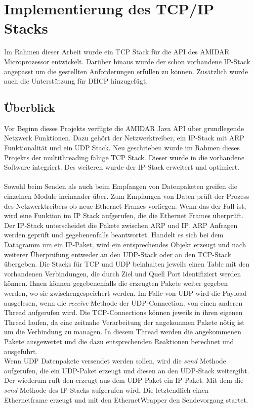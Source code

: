 \chapter{Implementierung des TCP/IP Stacks}
Im Rahmen dieser Arbeit wurde ein TCP Stack für die API des AMIDAR Microprozessor entwickelt. Darüber hinaus wurde der schon vorhandene IP-Stack angepasst um die gestellten Anforderungen erfüllen zu können. Zusätzlich wurde auch die Unterstützung für DHCP hinzugefügt.

\section{Überblick}
Vor Beginn dieses Projekts verfügte die AMIDAR Java API über grundlegende Netzwerk Funktionen. Dazu gehört der Netzwerktreiber, ein IP-Stack mit ARP Funktionalität und ein UDP Stack. Neu geschrieben wurde im Rahmen dieses Projekts der multithreading fähige TCP Stack. Dieser wurde in die vorhandene Software integriert. Des weiteren wurde der IP-Stack erweitert und optimiert.\\\\
Sowohl beim Senden als auch beim Empfangen von Datenpaketen greifen die einzelnen Module ineinander über. Zum Empfangen von Daten prüft der Prozess des Netzwerktreibers ob neue Ethernet Frames vorliegen. Wenn das der Fall ist, wird eine Funktion im IP Stack aufgerufen, die die Ethernet Frames überprüft. Der IP-Stack unterscheidet die Pakete zwischen ARP und IP. ARP Anfragen werden geprüft und gegebenenfalls beantwortet. Handelt es sich bei dem Datagramm um ein IP-Paket, wird ein entsprechendes Objekt erzeugt und nach weiterer Überprüfung entweder an den UDP-Stack oder an den TCP-Stack übergeben. Die Stacks für TCP und UDP beinhalten jeweils einen Table mit den vorhandenen Verbindungen, die durch Ziel und Quell Port identifiziert werden können. Ihnen können gegebenenfalls die erzeugten Pakete weiter gegeben werden, wo sie zwischengespeichert werden. Im Falle von UDP wird die Payload ausgelesen, wenn die \textit{receive} Methode der UDP-Connection, von einen anderen Thread aufgerufen wird. Die TCP-Connections können jeweils in ihren eigenen Thread laufen, da eine zeitnahe Verarbeitung der angekommen Pakete nötig ist um die Verbindung zu managen. In diesem Thread werden die angekommenen Pakete ausgewertet und die dazu entsprechenden Reaktionen berechnet und ausgeführt. \\
Wenn UDP Datenpakete versendet werden sollen, wird die \textit{send} Methode aufgerufen, die ein UDP-Paket erzeugt und diesen an den UDP-Stack weitergibt. Der wiederum ruft den erzeugt aus dem UDP-Paket ein IP-Paket. Mit dem die \textit{send} Methode des IP-Stacks aufgerufen wird. Die letztendlich einen Ethernetframe erzeugt und mit den EthernetWrapper den Sendevorgang startet.\\ \\
